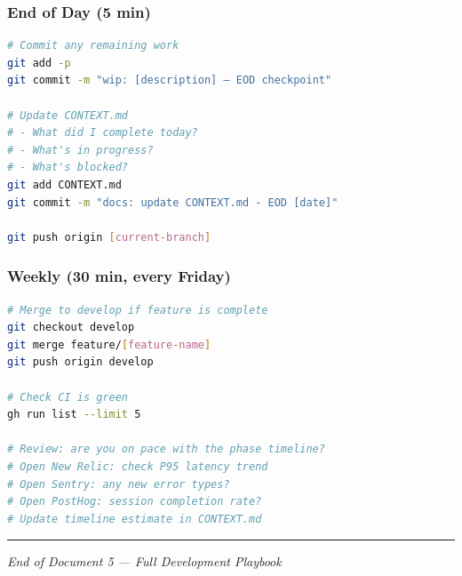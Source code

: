 \documentclass[
  11pt,
]{article}
\begin{document}
\hypertarget{end-of-day-5-min}{%
\subsubsection{End of Day (5 min)}\label{end-of-day-5-min}}

\begin{lstlisting}[language=bash]
# Commit any remaining work
git add -p
git commit -m "wip: [description] — EOD checkpoint"

# Update CONTEXT.md
# - What did I complete today?
# - What's in progress?
# - What's blocked?
git add CONTEXT.md
git commit -m "docs: update CONTEXT.md - EOD [date]"

git push origin [current-branch]
\end{lstlisting}

\hypertarget{weekly-30-min-every-friday}{%
\subsubsection{Weekly (30 min, every
Friday)}\label{weekly-30-min-every-friday}}

\begin{lstlisting}[language=bash]
# Merge to develop if feature is complete
git checkout develop
git merge feature/[feature-name]
git push origin develop

# Check CI is green
gh run list --limit 5

# Review: are you on pace with the phase timeline?
# Open New Relic: check P95 latency trend
# Open Sentry: any new error types?
# Open PostHog: session completion rate?
# Update timeline estimate in CONTEXT.md
\end{lstlisting}

\begin{center}\rule{0.5\linewidth}{0.5pt}\end{center}

\emph{End of Document 5 --- Full Development Playbook}
\end{document}
